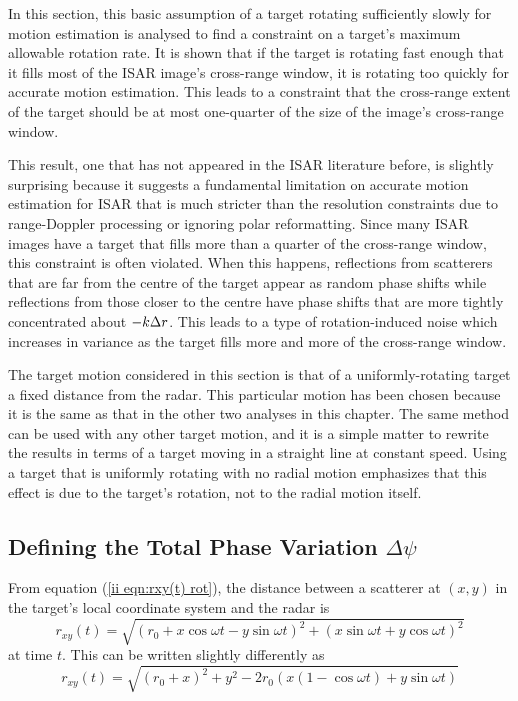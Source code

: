 In this section, this basic assumption of a target rotating sufficiently
slowly for motion estimation is analysed to find a constraint on a target's 
maximum allowable rotation rate.  It is shown that if the target is rotating
fast enough that it fills most of the ISAR image's cross-range window, it is
rotating too quickly for accurate motion estimation.  This leads to a
constraint that the cross-range extent of the target should be at most
one-quarter of the size of the image's cross-range window.

This result, one that has not appeared in the ISAR literature before, is
slightly surprising because it suggests a fundamental limitation on accurate
motion estimation for ISAR
that is much stricter than the resolution constraints due to range-Doppler
processing or ignoring polar reformatting.  Since many ISAR images have a
target that fills more than a quarter of the cross-range window, this
constraint is often violated.  When this happens, reflections from 
scatterers that are far from the centre of the target appear as random phase
shifts while reflections from those closer to the centre have phase shifts
that are more tightly concentrated about $-k{\Delta r}$.  This leads to a type of
rotation-induced noise which increases in variance as the target fills more
and more of the cross-range window.

The target motion considered in this section is that of a
uniformly-rotating target a fixed distance from the radar.  This
particular motion has been chosen because it is the same as that in the
other two analyses in this chapter.  The same method can be used with any
other target motion, and it is a simple matter to rewrite the results in
terms of a target moving in a straight line at constant speed.  Using a
target that is uniformly rotating with no radial motion emphasizes that this
effect is due to the target's rotation, not to the radial motion itself.

\subsection{Defining the Total Phase Variation $\Delta\psi$}


From equation (\ref{ii eqn:rxy(t) rot}), the distance between a scatterer at
$(x,y)$ in the target's local coordinate system and the radar is
\begin{equation}
r_{xy}(t)=\sqrt{(r_0+x\cos\omega t-y\sin\omega t)^2
+(x\sin\omega t+y\cos\omega t)^2}
\end{equation}
at time $t$.  This can be written slightly differently as
\begin{equation}
r_{xy}(t)=\sqrt{(r_0+x)^2+y^2-2r_0(x(1-\cos\omega t)+y\sin\omega t)}
\end{equation}

